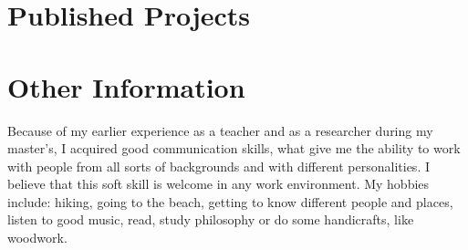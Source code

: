 \documentclass[letterpaper]{twentysecondcv} %
\begin{document}
\section{Published Projects}
\vspace{-0.2cm}
\begin{twentyshort} %


	
	
	

\end{twentyshort}
\vspace{0.3cm}

\section{Other Information}
\vspace{-0.2cm}
\begin{adjustwidth}{0.5em}{0.0em}
	Because of my earlier experience as a teacher and as a researcher
	during my master's, I acquired good communication skills, what give
	me the ability to work with people from all sorts of backgrounds and
	with different personalities.  I believe that this soft skill is
	welcome in any work environment. My hobbies include: hiking, going to the
	beach, getting to know different people and places, listen to good
	music, read, study philosophy or do some handicrafts, like woodwork.

\end{adjustwidth}

\end{document}
